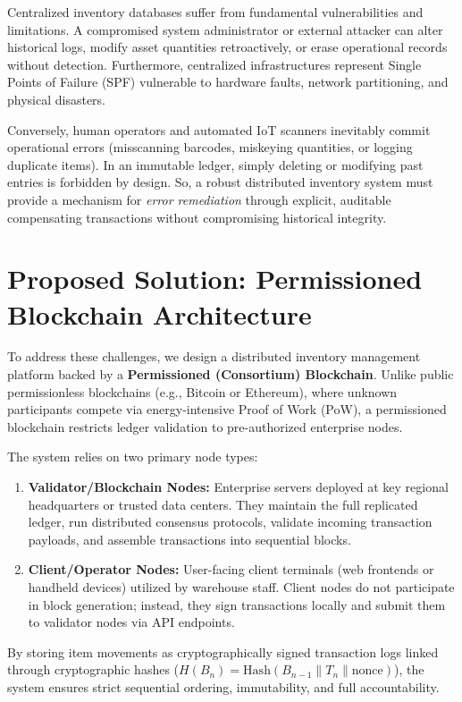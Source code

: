 \documentclass[11pt,a4paper]{memoir}
\begin{document}
Centralized inventory databases suffer from fundamental vulnerabilities and limitations. 
A compromised system administrator or external attacker can alter historical logs, modify asset quantities retroactively, or erase operational records without detection. 
Furthermore, centralized infrastructures represent Single Points of Failure (SPF) vulnerable to hardware faults, network partitioning, and physical disasters.

Conversely, human operators and automated IoT scanners inevitably commit operational errors (misscanning barcodes, miskeying quantities, or logging duplicate items). 
In an immutable ledger, simply deleting or modifying past entries is forbidden by design. 
So, a robust distributed inventory system must provide a mechanism for \textit{error remediation} through explicit, auditable compensating transactions without compromising historical integrity.

\section{Proposed Solution: Permissioned Blockchain Architecture}
To address these challenges, we design a distributed inventory management platform backed by a \textbf{Permissioned (Consortium) Blockchain}. Unlike public permissionless blockchains (e.g., Bitcoin or Ethereum), where unknown participants compete via energy-intensive Proof of Work (PoW), a permissioned blockchain restricts ledger validation to pre-authorized enterprise nodes.

The system relies on two primary node types:
\begin{enumerate}
    \item \textbf{Validator/Blockchain Nodes:} Enterprise servers deployed at key regional headquarters or trusted data centers. They maintain the full replicated ledger, run distributed consensus protocols, validate incoming transaction payloads, and assemble transactions into sequential blocks.
    \item \textbf{Client/Operator Nodes:} User-facing client terminals (web frontends or handheld devices) utilized by warehouse staff. Client nodes do not participate in block generation; instead, they sign transactions locally and submit them to validator nodes via API endpoints.
\end{enumerate}

By storing item movements as cryptographically signed transaction logs linked through cryptographic hashes ($H(B_n) = \text{Hash}(B_{n-1} \parallel T_n \parallel \text{nonce})$), the system ensures strict sequential ordering, immutability, and full accountability. 
\end{document}
